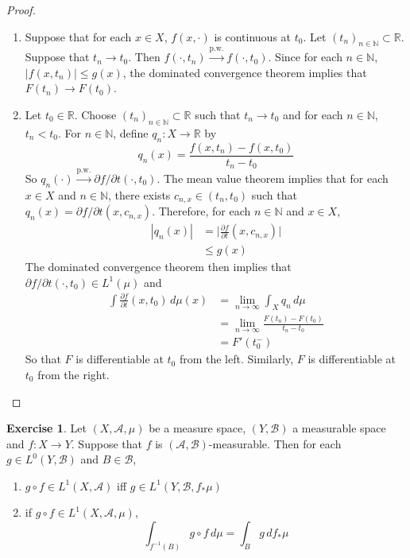 \documentclass{book}
\theoremstyle{definition}
\newtheorem{ex}[definition]{Exercise}
\newcommand{\N}{\mathbb{N}}
\newcommand{\R}{\mathbb{R}}
\newcommand{\MA}{\mathcal{A}}
\newcommand{\MB}{\mathcal{B}}
\DeclareMathOperator*{\0}{\mbf{0}}
\DeclareMathOperator*{\1}{\mbf{1}}
\newcommand{\p}{\partial}
\newcommand{\limn}{\lim \limits_{n \rightarrow \infty}}
\newcommand{\convt}[1]{\xrightarrow{\text{#1}}}
\newcommand{\dmu}{\, d \mu}
\begin{document}
	\begin{proof}\
	\begin{enumerate}
	\item Suppose that for each $x \in X$, $f(x, \cdot)$ is continuous at $t_0$. Let $(t_n)_{n \in \N} \subset \R$. Suppose that $t_n \rightarrow t_0$. Then $f(\cdot , t_n) \convt{p.w.} f(\cdot, t_0)$. Since for each $n \in \N$, $|f(x,t_n)| \leq g(x)$, the dominated convergence theorem implies that $F(t_n) \rightarrow F(t_0)$.
	\item Let $t_0 \in \R$. Choose $(t_n)_{n \in \N} \subset \R$ such that $ t_n \rightarrow t_0$ and for each $n \in \N$, $t_n < t_0$. For $n \in \N$, define $q_n:X \rightarrow \R$ by $$q_n(x) = \frac{f(x,t_n) - f(x, t_0)}{t_n - t_0}$$ So $q_n(\cdot) \convt{p.w.} \p f / \p t (\cdot, t_0)$. The mean value theorem implies that for each $x \in X$ and $n \in \N$, there exists $c_{n,x} \in (t_n,t_0)$ such that $q_n(x) = \p f / \p t (x, c_{n,x})$. Therefore, for each $n \in \N$ and $x \in X$, 
	\begin{align*}
		|q_n(x)| 
		& = \bigg | \frac{\p f}{\p t}(x, c_{n,x}) \bigg| \\
		& \leq g(x)
	\end{align*}
	The dominated convergence theorem then implies that $\p f / \p t (\cdot, t_0) \in L^1(\mu)$ and 
	\begin{align*}
	\int \frac{\p f }{\p t} (x, t_0) \dmu(x) 
	&=  \limn \int_X q_n \dmu  \\
	&= \limn \frac{F(t_n) - F(t_0)}{t_n - t_0} \\
	&= F'(t_0^-) 	
	\end{align*}
	So that $F$ is differentiable at $t_0$ from the left. Similarly, $F$ is differentiable at $t_0$ from the right. 
	\end{enumerate}
	\end{proof}

	\begin{ex}
		Let $(X, \MA, \mu)$ be a measure space, $(Y, \MB)$ a measurable space and $f: X \rightarrow Y$. Suppose that $f$ is $(\MA, \MB)$-measurable. Then for each $g \in L^0(Y, \MB)$ and $B \in \MB$, 
		\begin{enumerate}
			\item $g \circ f \in L^1(X, \MA)$ iff $g \in L^1(Y, \MB, f_* \mu)$
			\item if $g \circ f \in L^1(X, \MA, \mu)$, 
			$$\int_{f^{-1}(B)} g \circ f \dmu = \int_B g \, d f_*\mu$$
		\end{enumerate}
	\end{ex}
\end{document}
